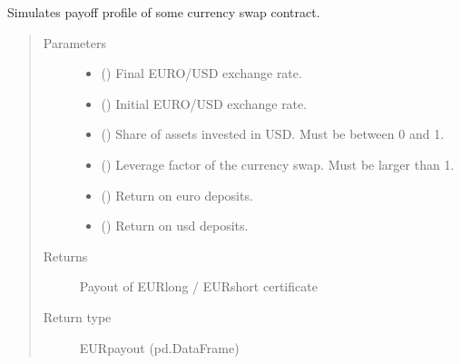 \documentclass[a4paper,11pt,english]{sphinxmanual}
\begin{document}
\begin{fulllineitems}
\label{\detokenize{financial_contracts:src.financial_contracts.swap_contract.payout_currency_swap}}
\sphinxAtStartPar
Simulates payoff profile of some currency swap contract.
\begin{quote}\begin{description}
\item[{Parameters}] \leavevmode\begin{itemize}
\item {} 
\sphinxAtStartPar
{} () \textendash{} Final EURO/USD exchange rate.

\item {} 
\sphinxAtStartPar
{} () \textendash{} Initial EURO/USD exchange rate.

\item {} 
\sphinxAtStartPar
{} () \textendash{} Share of assets invested in USD. Must be between 0 and 1.

\item {} 
\sphinxAtStartPar
{} () \textendash{} Leverage factor of the currency swap. Must be larger than 1.

\item {} 
\sphinxAtStartPar
{} () \textendash{} Return on euro deposits.

\item {} 
\sphinxAtStartPar
{} () \textendash{} Return on usd deposits.

\end{itemize}

\item[{Returns}] \leavevmode
\sphinxAtStartPar
Payout of EURlong / EURshort certificate

\item[{Return type}] \leavevmode
\sphinxAtStartPar
EURpayout (pd.DataFrame)

\end{description}\end{quote}

\end{fulllineitems}
\end{document}
